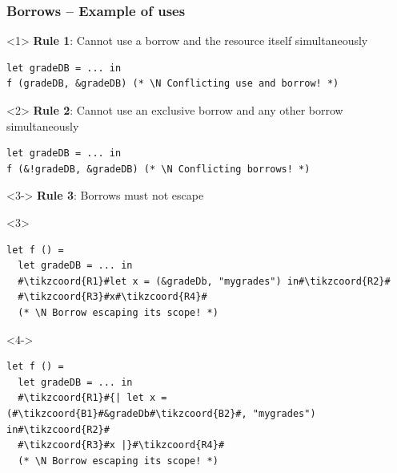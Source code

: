 \documentclass[aspectratio=169,dvipsnames,svgnames,10pt]{beamer}
\newcommand\Y{{\color{Green}{\ding{52}}}}
\newcommand\N{{\color{Red}{\ding{56}}}}
\begin{document}
\begin{frame}[fragile]
  \frametitle{Borrows -- Example of uses}

\begin{onlyenv}<1>
  \textbf{Rule 1}: Cannot use a borrow and the resource itself simultaneously
\begin{verbatim}
let gradeDB = ... in
f (gradeDB, &gradeDB) (* \N Conflicting use and borrow! *)
\end{verbatim}
\end{onlyenv}%
\begin{onlyenv}<2>
  \textbf{Rule 2}: Cannot use an exclusive borrow and any other borrow simultaneously
\begin{verbatim}
let gradeDB = ... in
f (&!gradeDB, &gradeDB) (* \N Conflicting borrows! *)
\end{verbatim}
\end{onlyenv}%
\begin{onlyenv}<3->
  \textbf{Rule 3}: Borrows must not escape
  \begin{onlyenv}<3>
\begin{verbatim}
let f () = 
  let gradeDB = ... in
  #\tikzcoord{R1}#let x = (&gradeDb, "mygrades") in#\tikzcoord{R2}#
  #\tikzcoord{R3}#x#\tikzcoord{R4}#
  (* \N Borrow escaping its scope! *)
\end{verbatim}
  \end{onlyenv}
  \begin{onlyenv}<4->
\begin{verbatim}
let f () = 
  let gradeDB = ... in
  #\tikzcoord{R1}#{| let x = (#\tikzcoord{B1}#&gradeDb#\tikzcoord{B2}#, "mygrades") in#\tikzcoord{R2}#
  #\tikzcoord{R3}#x |}#\tikzcoord{R4}#
  (* \N Borrow escaping its scope! *)
\end{verbatim}
  \end{onlyenv}%
\end{onlyenv}
\end{frame}
\end{document}
